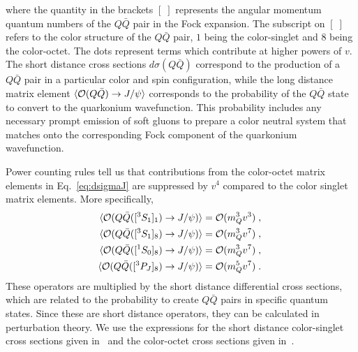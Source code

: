 \documentclass[article,showpacs,preprintnumbers,amsmath,amssymb]{revtex4}
\newcommand{\barQ}{{\bar{Q}}}
\newcommand{\calO}{{\cal{O}}}
\begin{document}
where the quantity in the brackets $[\;]$ represents the angular momentum
quantum numbers of the $Q\barQ$ pair in the Fock expansion. The subscript on
$[\;]$ refers to the color structure of the $Q\barQ$ pair, $1$ being 
the color-singlet and $8$ being the color-octet. The dots represent terms which contribute at
higher powers of $v$. The short distance cross sections $d\sigma(Q\barQ)$
correspond to the production of a $Q\barQ$ pair in a particular color and spin
configuration, while the long distance matrix element
$\langle\calO(Q\barQ)\rightarrow J/\psi\rangle$ corresponds to the probability
of the $Q\barQ$ state to convert to the quarkonium wavefunction. This
probability includes any necessary prompt emission of soft gluons to prepare a
color neutral system that matches onto the corresponding Fock component of the
quarkonium wavefunction. 


Power counting rules tell us that contributions from the color-octet matrix
elements in Eq.~\ref{eq:dsigmaJ} are suppressed by $v^4$ compared to the color
singlet matrix elements. More specifically,
\begin{equation}
\begin{split}
\langle \calO(Q\barQ([^3S_1]_{1})\rightarrow J/\psi)\rangle &= \calO(m_Q^3 v^3)\;, \\
\langle \calO(Q\barQ([^3S_1]_{8})\rightarrow J/\psi)\rangle &= \calO(m_Q^3 v^7)\;, \\
\langle \calO(Q\barQ([^1S_0]_{8})\rightarrow J/\psi)\rangle &= \calO(m_Q^3 v^7)\;, \\
\langle \calO(Q\barQ([^3P_J]_{8})\rightarrow J/\psi)\rangle &= 
\calO(m_Q^5 v^7) \;. ~\label{eq:scalingsJ}
\end{split}
\end{equation}
These operators are multiplied by the short distance differential cross sections,
which are related to the probability to create $Q\barQ$ pairs in specific
quantum states. Since these are short distance operators, they can be
calculated in perturbation theory. We use the expressions for the short
distance color-singlet cross sections given in~\cite{Baier:1983, Humpert:1987} 
and the color-octet cross sections given in~\cite{Cho:1995ce,Cho:1995vh,Braaten:2000cm}.
\end{document}
